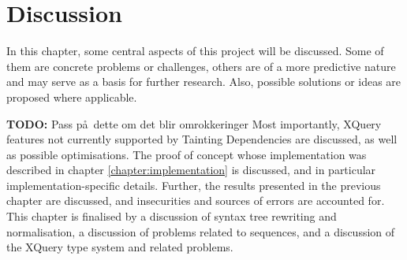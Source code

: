 \chapter{Discussion}
\label{chapter:discussion}
In this chapter, some central aspects of this project will be discussed. Some
of them are concrete problems or challenges, others are of a more predictive
nature and may serve as a basis for further research. Also, possible
solutions or ideas are proposed where applicable. 

\textbf{\LARGE TODO:} Pass p\aa~dette om det blir omrokkeringer
Most importantly, XQuery features not
currently supported by Tainting Dependencies are discussed, as well as
possible optimisations. The proof of concept whose implementation was
described in chapter \ref{chapter:implementation} is discussed, and in
particular implementation-specific details. Further, the results presented in
the previous chapter are discussed, and insecurities and sources of errors are
accounted for. This chapter is finalised by a discussion of syntax tree
rewriting and normalisation, a discussion of problems related to sequences,
and a discussion of the XQuery type system and related problems.










